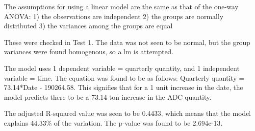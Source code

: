 \documentclass[12pt,]{article}
\newenvironment{Shaded}{\begin{snugshade}}{\end{snugshade}}
\newcommand{\KeywordTok}[1]{\textcolor[rgb]{0.13,0.29,0.53}{\textbf{#1}}}
\newcommand{\DataTypeTok}[1]{\textcolor[rgb]{0.13,0.29,0.53}{#1}}
\newcommand{\DecValTok}[1]{\textcolor[rgb]{0.00,0.00,0.81}{#1}}
\newcommand{\StringTok}[1]{\textcolor[rgb]{0.31,0.60,0.02}{#1}}
\newcommand{\CommentTok}[1]{\textcolor[rgb]{0.56,0.35,0.01}{\textit{#1}}}
\newcommand{\OtherTok}[1]{\textcolor[rgb]{0.56,0.35,0.01}{#1}}
\newcommand{\OperatorTok}[1]{\textcolor[rgb]{0.81,0.36,0.00}{\textbf{#1}}}
\newcommand{\NormalTok}[1]{#1}
\begin{document}
The assumptions for using a linear model are the same as that of the
one-way ANOVA: 1) the observations are independent 2) the groups are
normally distributed 3) the variances among the groups are equal

These were checked in Test 1. The data was not seen to be normal, but
the group variances were found homogenous, so a lm is attempted.

The model uses 1 dependent variable = quarterly quantity, and 1
independent variable = time. The equation was found to be as follows:
Quarterly quantity = 73.14*Date - 190264.58. This signifies that for a 1
unit increase in the date, the model predicts there to be a 73.14 ton
increase in the ADC quantity.

The adjusted R-squared value was seen to be 0.4433, which means that the
model explains 44.33\% of the variation. The p-value was found to be
2.694e-13.

\begin{Shaded}
\end{Shaded}
\end{document}

